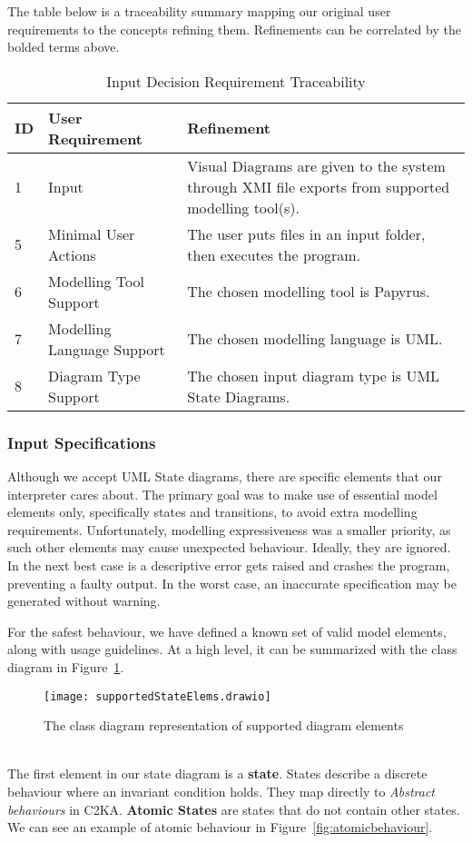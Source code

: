 The table below is a traceability summary mapping our original user requirements to the concepts refining them.
Refinements can be correlated by the bolded terms above.

\begin{table}[htbp]
    \centering
    \caption{Input Decision Requirement Traceability}\label{tab:input-table}
    \begin{tabularx}{\textwidth}{| l | l | X |}
        \hline
        \textbf{ID} & \textbf{User Requirement} & \textbf{Refinement} \\
        \hline
        1 & Input & Visual Diagrams are given to the system through XMI file exports from supported modelling tool(s). \\ \hline
        5 & Minimal User Actions & The user puts files in an input folder, then executes the program.  \\ \hline
        6 & Modelling Tool Support & The chosen modelling tool is Papyrus. \\ \hline
        7 & Modelling Language Support & The chosen modelling language is UML. \\ \hline
        8 & Diagram Type Support & The chosen input diagram type is UML State Diagrams. \\ \hline
    \end{tabularx}
\end{table}

\newpage
\subsubsection{Input Specifications}\label{subsubsec:input-specification}
Although we accept UML State diagrams, there are specific elements that our interpreter cares about.
The primary goal was to make use of essential model elements only, specifically states and transitions,
to avoid extra modelling requirements.
Unfortunately, modelling expressiveness was a smaller priority, as such
other elements may cause unexpected behaviour.
Ideally, they are ignored.
In the next best case is a descriptive error gets raised and crashes the program, preventing a faulty output.
In the worst case, an inaccurate specification may be generated without warning.

For the safest behaviour, we have defined a known set of valid model elements, along with usage guidelines.
At a high level, it can be summarized with the class diagram in Figure~\ref{fig:supportedElems}.
\begin{figure}[ht]
    \centering
    \texttt{[image: supportedStateElems.drawio]}
    \caption{The class diagram representation of supported diagram elements}
    \label{fig:supportedElems}
\end{figure}
\\
The first element in our state diagram is a \textbf{state}.
States describe a discrete behaviour where an invariant condition holds.
They map directly to \textit{Abstract behaviours} in C2KA\@.
\textbf{Atomic States} are states that do not contain other states.
We can see an example of atomic behaviour in Figure~\ref{fig:atomicbehaviour}.

